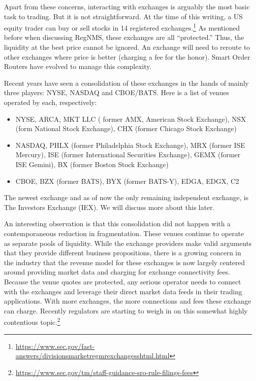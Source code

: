 Apart from these concerns, interacting with exchanges is arguably the most basic task to trading. But it is not straightforward. At the time of this writing, a US equity trader can buy or sell stocks in 14 registered exchanges.\footnote{\url{https://www.sec.gov/fast-answers/divisionsmarketregmrexchangesshtml.html}} As mentioned before when discussing RegNMS, these exchanges are all ``protected.'' Thus, the liquidity at the best price cannot be ignored. An exchange will need to reroute to other exchanges where price is better (charging a fee for the honor). Smart Order Routers have evolved to manage this complexity.


Recent years have seen a consolidation of these exchanges in the hands of mainly three players: NYSE, NASDAQ and CBOE/BATS. Here is a list of venues operated by each, respectively:
        \begin{itemize}
        \item NYSE, ARCA, MKT LLC ( former AMX, American Stock Exchange), NSX (form National Stock Exchange), CHX (former Chicago Stock Exchange)
        \item NASDAQ, PHLX (former Philadelphia Stock Exchange), MRX (former ISE Mercury), ISE (former International Securities Exchange), GEMX (former ISE Gemini), BX (former Boston Stock Exchange)
        \item CBOE, BZX (former BATS), BYX (former BATS-Y), EDGA, EDGX, C2
        \end{itemize}
The newest exchange and as of now the only remaining independent exchange, is The Investors Exchange (IEX). We will discuss more about this later.


An interesting observation is that this consolidation did not happen with a contemporaneous reduction in fragmentation. These venues continue to operate as separate pools of liquidity. While the exchange providers make valid arguments that they provide different business propositions, there is a growing concern in the industry that the revenue model for these exchanges is now largely centered around providing market data and charging for exchange connectivity fees. Because the venue quotes are protected, any serious operator needs to connect with the exchanges and leverage their direct market data feeds in their trading applications. With more exchanges, the more connections and fees these exchange can charge. Recently regulators are starting to weigh in on this somewhat highly contentious topic.\footnote{\url{https://www.sec.gov/tm/staff-guidance-sro-rule-filings-fees}}


